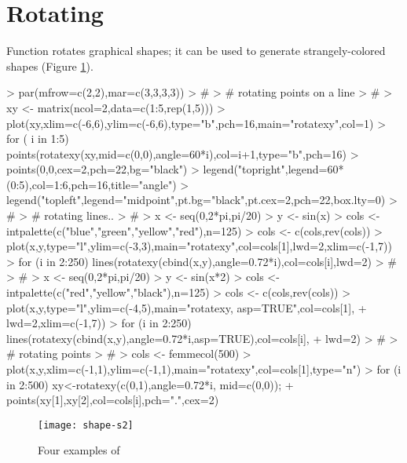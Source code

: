 \documentclass[article,nojss]{jss}
\begin{document}
\section{Rotating}
Function  rotates graphical shapes; it can be used to generate
strangely-colored shapes (Figure \ref{fig:s2}).
\begin{Schunk}
\begin{Sinput}
> par(mfrow=c(2,2),mar=c(3,3,3,3))
> #
> # rotating points on a line
> #
> xy <- matrix(ncol=2,data=c(1:5,rep(1,5)))
> plot(xy,xlim=c(-6,6),ylim=c(-6,6),type="b",pch=16,main="rotatexy",col=1)
> for ( i in 1:5) points(rotatexy(xy,mid=c(0,0),angle=60*i),col=i+1,type="b",pch=16)
> points(0,0,cex=2,pch=22,bg="black")
> legend("topright",legend=60*(0:5),col=1:6,pch=16,title="angle")
> legend("topleft",legend="midpoint",pt.bg="black",pt.cex=2,pch=22,box.lty=0)
> #
> # rotating lines..
> #
> x <- seq(0,2*pi,pi/20)
> y <- sin(x)
> cols <- intpalette(c("blue","green","yellow","red"),n=125)
> cols <- c(cols,rev(cols))
> plot(x,y,type="l",ylim=c(-3,3),main="rotatexy",col=cols[1],lwd=2,xlim=c(-1,7))
> for (i in 2:250) lines(rotatexy(cbind(x,y),angle=0.72*i),col=cols[i],lwd=2)
> #
> #
> x <- seq(0,2*pi,pi/20)
> y <- sin(x*2)
> cols <- intpalette(c("red","yellow","black"),n=125)
> cols <- c(cols,rev(cols))
> plot(x,y,type="l",ylim=c(-4,5),main="rotatexy, asp=TRUE",col=cols[1],
+      lwd=2,xlim=c(-1,7))
> for (i in 2:250) lines(rotatexy(cbind(x,y),angle=0.72*i,asp=TRUE),col=cols[i],
+      lwd=2)
> #
> # rotating points
> #
> cols <- femmecol(500)
> plot(x,y,xlim=c(-1,1),ylim=c(-1,1),main="rotatexy",col=cols[1],type="n")
> for (i in 2:500) {xy<-rotatexy(c(0,1),angle=0.72*i, mid=c(0,0));
+                     points(xy[1],xy[2],col=cols[i],pch=".",cex=2)}
\end{Sinput}
\end{Schunk}
\begin{figure}
\begin{center}
\texttt{[image: shape-s2]}
\end{center}
\caption{Four examples of }
\label{fig:s2}
\end{figure}
\end{document}
